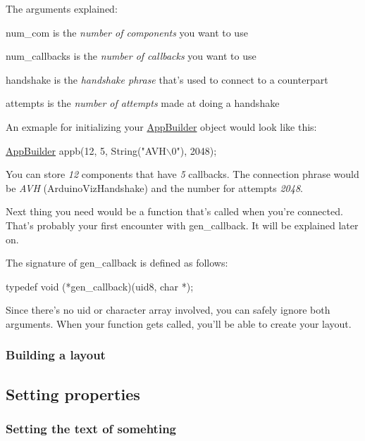 The arguments explained\+:
\begin{DoxyItemize}
\item {\ttfamily num\+\_\+com} is the {\itshape number of components} you want to use
\item {\ttfamily num\+\_\+callbacks} is the {\itshape number of callbacks} you want to use
\item {\ttfamily handshake} is the {\itshape handshake phrase} that's used to connect to a counterpart
\item {\ttfamily attempts} is the {\itshape number of attempts} made at doing a handshake
\end{DoxyItemize}

An exmaple for initializing your \hyperlink{class_app_builder}{App\+Builder} object would look like this\+:


\begin{DoxyCode}
\hyperlink{class_app_builder}{AppBuilder} appb(12, 5, String(\textcolor{stringliteral}{"AVH\(\backslash\)0"}), 2048);
\end{DoxyCode}


You can store {\itshape 12} components that have {\itshape 5} callbacks. The connection phrase would be {\itshape A\+V\+H} (Arduino\+Viz\+Handshake) and the number for attempts {\itshape 2048}.

Next thing you need would be a function that's called when you're connected. That's probably your first encounter with {\ttfamily gen\+\_\+callback}. It will be explained later on.

The signature of {\ttfamily gen\+\_\+callback} is defined as follows\+: 
\begin{DoxyCode}
\textcolor{keyword}{typedef} void (*gen\_callback)(uid8, \textcolor{keywordtype}{char} *);
\end{DoxyCode}


Since there's no uid or character array involved, you can safely ignore both arguments. When your function gets called, you'll be able to create your layout.

\subsubsection*{Building a layout}

\subsection*{Setting properties}

\subsubsection*{Setting the text of somehting}

